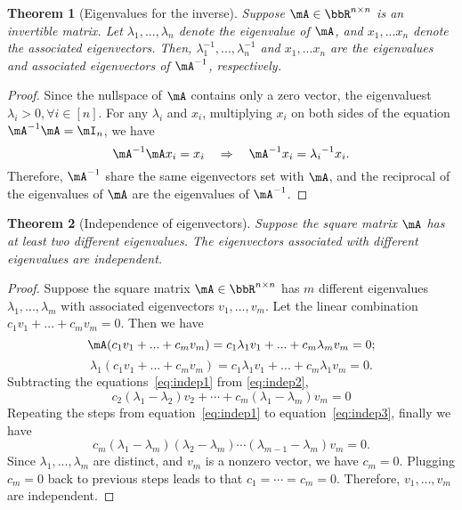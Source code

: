 \documentclass[11pt]{article}
\theoremstyle{plain}
\newtheorem{thm}{Theorem}[section]
\theoremstyle{definition}
\begin{document}
\begin{thm}[Eigenvalues for the inverse]
Suppose $\mA \in \bbR^{n \times n}$ is an invertible matrix. Let $\lambda_1,...,\lambda_n$ denote the eigenvalue of $\mA$, and $x_1,...x_n$ denote the associated eigenvectors. Then,  $\lambda_1^{-1},...,\lambda_n^{-1}$ and $x_1,...x_n$ are the eigenvalues and associated eigenvectors of $\mA^{-1}$, respectively.
\end{thm}

\begin{proof}
	Since the nullspace of $\mA$ contains only a zero vector, the eigenvaluest $\lambda_i >0,  \forall i \in [n]$. For any $\lambda_i$ and $x_i$, multiplying $x_i$ on both sides of the equation $\mA^{-1} \mA = \mI_n$, we have 
	\[ \mA^{-1} \mA x_i = x_i \quad \Rightarrow\quad  \mA^{-1} x_i = {\lambda_i}^{-1} x_i.  \]
	Therefore, $\mA^{-1}$ share the same eigenvectors set with $\mA$, and the reciprocal of the eigenvalues of $\mA$ are the eigenvalues of $\mA^{-1}$.
\end{proof}

\begin{thm}[Independence of eigenvectors]\label{thm:indepeigen} 
Suppose the square matrix $\mA$ has at least two different eigenvalues. The eigenvectors associated with different eigenvalues are independent.
\end{thm}

\begin{proof}
	Suppose the square matrix $\mA \in \bbR^{n \times n}$ has $m$ different eigenvalues $\lambda_1,...,\lambda_m$ with associated eigenvectors  $v_1,...,v_m$. Let the linear combination $c_1 v_1 + ... + c_m v_m = 0$.	
	Then we have
	\begin{equation}\label{eq:indep1}
		\mA(c_1 v_1 + ... + c_m v_m ) = c_1 \lambda_1 v_1 + ... + c_m \lambda_m v_m = 0;  
		\end{equation}
		\begin{equation}\label{eq:indep2}
		\lambda_1 (c_1 v_1 + ... + c_m v_m ) = c_1 \lambda_1 v_1 + ... + c_m \lambda_1 v_m = 0. 
	\end{equation}
	Subtracting the equations~\eqref{eq:indep1} from \eqref{eq:indep2}, 
	\begin{equation}\label{eq:indep3}
		 c_2 (\lambda_1 - \lambda_2) v_2 + \cdots + c_m (\lambda_1 - \lambda_m) v_m  = 0
	\end{equation}
	Repeating the steps from equation~\eqref{eq:indep1} to equation~\eqref{eq:indep3}, finally we have 
	\[ c_m(\lambda_1 - \lambda_m)(\lambda_2 - \lambda_m)\cdots (\lambda_{m-1} - \lambda_m) v_m = 0.    \]
	 Since $\lambda_1 ,..., \lambda_m$ are distinct, and $v_m$ is a nonzero vector, we have $c_m = 0$.  Plugging $c_m = 0$ back to previous steps leads to that $c_1 = \cdots = c_m = 0$. Therefore, $v_1,...,v_m$ are independent.
\end{proof}
\end{document}

